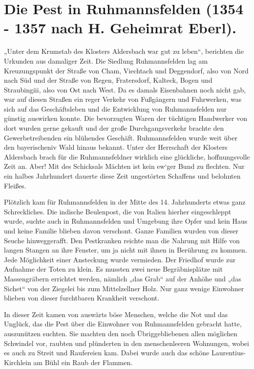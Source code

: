 \documentclass[12pt,a4paper]{book}
\begin{document}
\section{Die Pest in Ruhmannsfelden (1354 - 1357 nach H. Geheimrat Eberl).}

„Unter dem Krumstab des Klosters Aldersbach war gut zu leben“, berichten die
Urkunden aus damaliger Zeit. Die Siedlung Ruhmannsfelden lag am Kreuzungspunkt
der Straße von Cham, Viechtach und Deggendorf, also von Nord nach Süd und der
Straße von Regen, Fratersdorf, Kalteck, Bogen und Straubingiii, also von Ost
nach West. Da es damals Eisenbahnen noch nicht gab, war auf diesen Straßen ein
reger Verkehr von Fußgängern und Fuhrwerken, was sich auf das Geschäftsleben und
die Entwicklung von Ruhmannsfelden nur günstig auswirken konnte. Die bevorzugten
Waren der tüchtigen Handwerker von dort wurden gerne gekauft und der große
Durchgangsverkehr brachte den Gewerbetreibenden ein blühendes Geschäft.
Ruhmannsfelden wurde weit über den bayerischeniv Wald hinaus bekannt. Unter der
Herrschaft der Klosters Aldersbach brach für die Ruhmannsfeldner wirklich eine
glückliche, hoffnungsvolle Zeit an. Aber! Mit des Schicksals Mächten ist kein
ew`ger Bund zu flechten. Nur ein halbes Jahrhundert dauerte diese Zeit
ungestörten Schaffens und belohnten Fleißes.

Plötzlich kam für Ruhmannsfelden in der Mitte des 14. Jahrhunderts etwas ganz
Schreckliches. Die indische Beulenpost, die von Italien hierher eingeschleppt
wurde, suchte auch in Ruhmannsfelden und Umgebung ihre Opfer und kein Haus und
keine Familie blieben davon verschont. Ganze Familien wurden von dieser Seuche
hinweggerafft. Den Pestkranken reichte man die Nahrung mit Hilfe von langen
Stangen an ihre Fenster, um ja nicht mit ihnen in Berührung zu kommen. Jede
Möglichkeit einer Ansteckung wurde vermieden. Der Friedhof wurde zur Aufnahme
der Toten zu klein. Es mussten zwei neue Begräbnisplätze mit Massengräbern
errichtet werden, nämlich „das Grab“ auf der Anhöhe und „das Sichet“ von der
Ziegelei bis zum Mittelzellner Holz. Nur ganz wenige Einwohner blieben von
dieser furchtbaren Krankheit verschont.

In dieser Zeit kamen von auswärts böse Menschen, welche die Not und das Unglück,
das die Pest über die Einwohner von Ruhmannsfelden gebracht hatte, auszunützen
suchten. Sie machten den noch Übriggebliebenen allen möglichen Schwindel vor,
raubten und plünderten in den menschenleeren Wohnungen, wobei es auch zu Streit
und Raufereien kam. Dabei wurde auch das schöne Laurentius-Kirchlein am Bühl ein
Raub der Flammen.
\end{document}
